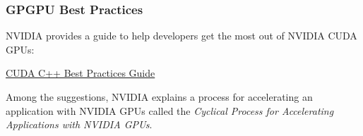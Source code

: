 \subsubsection{GPGPU Best Practices}

NVIDIA provides a guide to help developers get the most out of NVIDIA CUDA GPUs:
\begin{center}
    \href{https://docs.nvidia.com/cuda/cuda-c-best-practices-guide/}{CUDA C++ Best Practices Guide} \hspace{2em} 
\end{center}

\noindent
Among the suggestions, NVIDIA explains a process for accelerating an application with NVIDIA GPUs called the \emph{Cyclical Process for Accelerating Applications with NVIDIA GPUs}.

